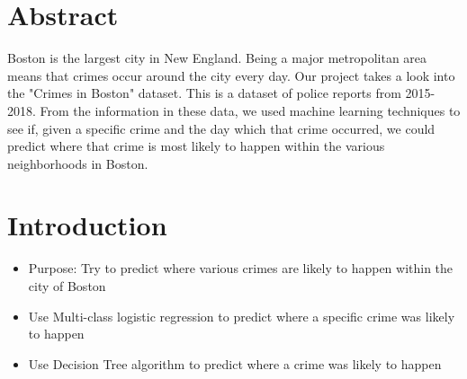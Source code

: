 \documentclass[a0,landscape]{a0poster}
\let\Section=\section
\def\section{\setcounter{equation}{0}\Section}
\newcommand{\1}{\bold{1}}
\begin{document}
\begin{multicols}{3} %

\vspace{0.05cm} %




\section*{Abstract}
Boston is the largest city in New England. Being a major metropolitan area means that crimes occur around the city every day. Our project takes a look into the "Crimes in Boston" dataset. This is a dataset of police reports from 2015-2018. From the information in these data, we used machine learning techniques to see if, given a specific crime and the day which that crime occurred, we could predict where that crime is most likely to happen within the various neighborhoods in Boston. 



\color{SaddleBrown} %




\color{black}\section{Introduction}
\begin{itemize}
\item Purpose: Try to predict where various crimes are likely to happen within the city of Boston
\item Use Multi-class logistic regression to predict where a specific crime was likely to happen
\item Use Decision Tree algorithm to predict where a crime was likely to happen
\end{itemize}
\columnsep=5pt
\columnseprule=0pt




\end{multicols}
\end{document}
